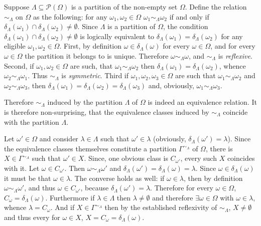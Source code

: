\documentclass[a4paper]{article}
\newcommand{\brac}[1]{{\left({#1}\right)}}
\begin{document}
Suppose $\Lambda\subseteq \mathcal{P}\brac{\Omega}$ is a partition of the non-empty set $\Omega$. Define the relation $\sim_\Lambda$ on $\Omega$ as the following: for any $\omega_1, \omega_2\in \Omega$ $\omega_1\sim_\Lambda \omega_2$ if and only if $\delta_\Lambda(\omega_1)\cap\delta_\Lambda(\omega_2)\neq \emptyset$. Since $\Lambda$ is a partition of $\Omega$, the condition $\delta_\Lambda(\omega_1)\cap\delta_\Lambda(\omega_2)\neq \emptyset$ is logically equivalent to $\delta_\Lambda(\omega_1)=\delta_\Lambda(\omega_2)$ for any eligible $\omega_1, \omega_2\in \Omega$.
First, by definition $\omega\in \delta_\Lambda(\omega)$ for every $\omega\in \Omega$, and for every $\omega\in \Omega$ the partition it belongs to is unique. Therefore $\omega\sim_\Lambda \omega$, and $\sim_\Lambda$ is \emph{reflexive}.
Second, if $\omega_1, \omega_2\in \Omega$ are such, that $\omega_1\sim_\Lambda \omega_2$ then $\delta_\Lambda(\omega_1)=\delta_\Lambda(\omega_2)$, whence $\omega_2\sim_\Lambda \omega_1$. Thus $\sim_\Lambda$ is \emph{symmetric}.
Third if $\omega_1, \omega_2, \omega_3\in \Omega$ are such that $\omega_1\sim_\Lambda \omega_2$ and $\omega_2\sim_\Lambda \omega_3$, then $\delta_\Lambda(\omega_1)=\delta_\Lambda(\omega_2)=\delta_\Lambda(\omega_3)$ and, obviously, $\omega_1\sim_\Lambda \omega_3$.

Therefore $\sim_\Lambda$ induced by the partition $\Lambda$ of $\Omega$ is indeed an equivalence relation. It is therefore non-surprising, that the equivalence classes induced by $\sim_\Lambda$ coincide with the partition $\Lambda$.

Let $\omega'\in \Omega$ and consider $\lambda\in \Lambda$ such that $\omega'\in \lambda$ (obviously, $\delta_\Lambda(\omega')=\lambda$). Since the equivalence classes themselves constitute a partition $\Gamma^{\sim_\Lambda}$ of $\Omega$, there is $X\in \Gamma^{\sim_\Lambda}$ such that $\omega'\in X$. Since, one obvious class is $C_{\omega'}$, every such $X$ coincides with it. Let $\omega\in C_{\omega'}$. Then $\omega\sim_\Lambda \omega'$ and $\delta_\Lambda(\omega')=\delta_\Lambda(\omega)=\lambda$. Since $\omega\in \delta_\Lambda(\omega)$ it must be that $\omega\in \lambda$. The converse holds as well: if $\omega\in \lambda$, then by definition $\omega\sim_\Lambda \omega'$, and thus $\omega\in C_{\omega'}$, because $\delta_\Lambda(\omega')=\lambda$. Therefore for every $\omega\in \Omega$, $C_\omega=\delta_\Lambda(\omega)$. Furthermore if $\lambda\in \Lambda$ then $\lambda\neq \emptyset$ and therefore $\exists \omega\in \Omega$ with $\omega\in \lambda$, whence $\lambda=C_\omega$. And if $X\in \Gamma^{\sim_\Lambda}$ then by the established reflexivity of $\sim_\Lambda$, $X\neq \emptyset$ and thus every for $\omega\in X$, $X=C_\omega=\delta_\Lambda(\omega)$.
\end{document}
